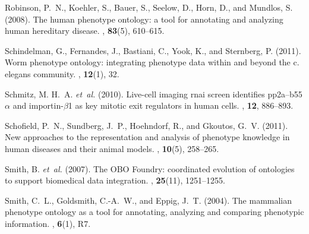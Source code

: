\documentclass{bioinfo}
\begin{document}
\begin{thebibliography}{}
Robinson, P.~N., Koehler, S., Bauer, S., Seelow, D., Horn, D., and Mundlos, S.
  (2008).
\newblock The human phenotype ontology: a tool for annotating and analyzing
  human hereditary disease.
, {\bf 83}(5), 610--615.

Schindelman, G., Fernandes, J., Bastiani, C., Yook, K., and Sternberg, P.
  (2011).
\newblock Worm phenotype ontology: integrating phenotype data within and beyond
  the c. elegans community.
, {\bf 12}(1), 32.

Schmitz, M. H.~A. {\em et~al.} (2010).
\newblock Live-cell imaging rnai screen identifies pp2a–b55$\alpha$ and
  importin-$\beta$1 as key mitotic exit regulators in human cells.
, {\bf 12}, 886--893.

Schofield, P.~N., Sundberg, J.~P., Hoehndorf, R., and Gkoutos, G.~V. (2011).
\newblock New approaches to the representation and analysis of phenotype
  knowledge in human diseases and their animal models.
, {\bf 10}(5), 258--265.

Smith, B. {\em et~al.} (2007).
\newblock The {OBO} {F}oundry: coordinated evolution of ontologies to support
  biomedical data integration.
, {\bf 25}(11), 1251--1255.

Smith, C.~L., Goldsmith, C.-A.~W., and Eppig, J.~T. (2004).
\newblock The mammalian phenotype ontology as a tool for annotating, analyzing
  and comparing phenotypic information.
, {\bf 6}(1), R7.

\end{thebibliography}
\end{document}
